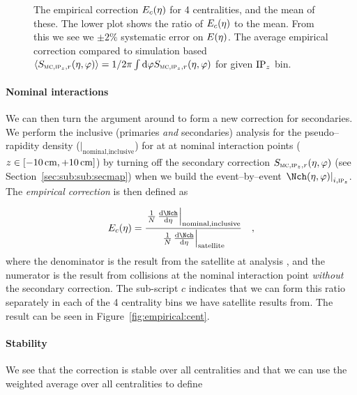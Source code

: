 \documentclass[compat,11pt]{alicenote}
\newcommand*{\etaphi}{\ensuremath(\eta,\varphi)}
\newcommand*\SecMap{\ensuremath S_{\subMC,\subIPz,r}\etaphi}
\newcommand*\EmpCor[1][]{\ensuremath E\ifx|#1|\relax\else_{#1}\fi(\eta)}
\newcommand{\secref}[1]{Section~\ref{#1}}
\newcommand{\figref}[1]{Figure~\ref{#1}}
\newcommand{\dndetadphi}[1][]{{\ensuremath%
    \ifx|#1|\else\left.\fi%
      \Nch\etaphi%
      \ifx|#1|\else\right|_{#1}\fi}}
\newcommand\figinput[2][\textwidth]{%
  \texttt{[image: \\jobname-\#2]}}
\begin{document}
\begin{figure}[h!tbp]
  \centering
  \subfigure[]{
    \label{fig:empirical:cent}\figinput[.45\linewidth]{empirical_cent}}
  \subfigure[]{
    \label{fig:empirical:secmap}\figinput[.45\linewidth]{secmap_empcor}}
  \caption{ The empirical correction
    $\EmpCor[c]{}$ for 4 centralities, and the mean of these.  The
    lower plot shows the ratio of $\EmpCor[c]{}$ to the mean.  From
    this we see we $\pm2\%$ systematic error on
    $\EmpCor{}$.  The average empirical
    correction compared to simulation based
    $\langle\SecMap\rangle=1/2\pi\int\text{d}\varphi\SecMap{}$ for
    given $\IPz{}$ bin. } 
\end{figure}


\paragraph{Nominal interactions} 
We can then turn the argument around to form a new correction for
secondaries.  We perform the inclusive (primaries \emph{and}
secondaries) analysis for the pseudo--rapidity density
(\ndndeta{}$|_{\text{nominal,inclusive}}$) for \PbPbCol{} at
 at nominal interaction points
($z\in[\unit[-10]{\text{cm}},\unit[+10]{\text{cm}}]$) by turning off
the secondary correction $\SecMap$ (see \secref{sec:sub:sub:secmap})
when we build the event--by--event $\dndetadphi[i,\subIPz]$.  The
\emph{empirical correction} is then defined as

\begin{equation}
  \label{eq:empirical:cent}
  \EmpCor[c]{} = \frac{%
    \left.\ndndeta\right|_{\text{nominal,inclusive}}}{%
    \left.\ndndeta\right|_{\text{satellite}}}\quad,
\end{equation}
where the denominator is the result from the satellite \PbPbCol{} at
 analysis \cite{Abbas:2013bpa}, and the numerator is
the result from collisions at the nominal interaction point
\emph{without} the secondary correction.   The sub-script $c$
indicates that we can form this ratio separately in each of the 4
centrality bins we have satellite results from.  The result can be
seen in \figref{fig:empirical:cent}. 

\paragraph{Stability}
We see that the correction is stable over all centralities and that we
can use the weighted average over all centralities to define 
\end{document}
